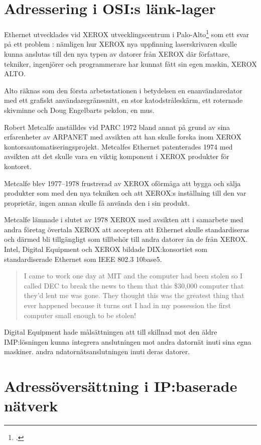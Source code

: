 \documentclass[swedish,10pt,a4paper]{article}
\begin{document}
\section{Adressering i OSI:s länk-lager}\label{sec:adressering_i_osis_data_link_layer}

Ethernet utvecklades vid XEROX utvecklingscentrum i Palo-Alto\footcite[kapitel 1]{Spurgeon2000}
som ett svar på ett problem : nämligen hur XEROX nya uppfinning laserskrivaren
skulle kunna anslutas till den nya typen av datorer från XEROX där författare, tekniker,
ingenjörer och programmerare har kunnat fått sin egen maskin, XEROX ALTO.

Alto räknas som den första arbetsstationen i betydelsen en enanvändaredator med ett grafiskt
användaregränssnitt, en stor katodstråleskärm, ett roternade skivminne
och Doug Engelbarts pekdon, en mus.

Robert Metcalfe anställdes vid PARC 1972 bland annat på grund av sina erfarenheter av ARPANET
med avsikten att han skulle forska inom XEROX kontorsautomatiseringsprojekt.
Metcalfes Ethernet patenterades 1974 med avsikten att det skulle vara en viktig
komponent i XEROX produkter för kontoret.

Metcalfe blev 1977--1978 frustrerad av XEROX oförmåga att bygga och sälja produkter som
med den nya tekniken och att XEROX:s inställning till den var proprietär, ingen
annan skulle få använda den i sin produkt.

Metcalfe lämnade i slutet av 1978 XEROX med avsikten att i samarbete med andra
företag övertala XEROX att acceptera att Ethernet skulle standardiseras
och därmed bli tillgängligt som tillbehör till andra datorer än de från
XEROX. Intel, Digital Equipment och XEROX bildade DIX:konsortiet som
standardiserade Ethernet som IEEE 802.3 10base5.

\blockquote[\cite{Robert Metcalfe}]{I came to work one day at MIT and the computer had
  been stolen so I called DEC to break the news to them that this \$30,000
  computer that they'd lent me was gone. They thought this was the greatest thing that ever
  happened because it turns out I had in my possession the first computer small enough to be stolen!}

Digital Equipment hade målsättningen att till skillnad mot den äldre IMP:lösningen
kunna integrera anslutningen mot andra datornät inuti sina egna maskiner.
andra ndatornätsanslutningen inuti deras datorer.


\section{Adressöversättning i IP:baserade nätverk}\label{sec:address_translation}
\end{document}
